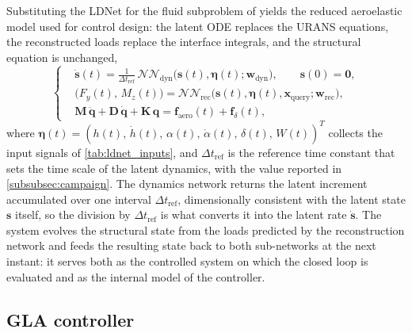 Substituting the LDNet for the fluid subproblem of  yields the reduced aeroelastic model used for control design: the latent ODE replaces the URANS equations, the reconstructed loads replace the interface integrals, and the structural equation is unchanged,
\begin{equation}
\left\{
\begin{aligned}
&\dot{\mathbf{s}}(t) = \frac{1}{\Delta t_{\mathrm{ref}}}\,
    \mathcal{NN}_{\mathrm{dyn}}\big(\mathbf{s}(t), \boldsymbol{\eta}(t);
    \mathbf{w}_{\mathrm{dyn}}\big), \qquad \mathbf{s}(0) = \mathbf{0},\\
&\bigl(F_y(t),\,M_z(t)\bigr) = \mathcal{NN}_{\mathrm{rec}}\big(\mathbf{s}(t), \boldsymbol{\eta}(t),
    \mathbf{x}_{\mathrm{query}}; \mathbf{w}_{\mathrm{rec}}\big),\\
&\mathbf{M}\,\ddot{\mathbf{q}} + \mathbf{D}\,\dot{\mathbf{q}} + \mathbf{K}\,\mathbf{q}
    = \mathbf{f}_{\text{aero}}(t) + \mathbf{f}_{\delta}(t),
\end{aligned}
\right.
\label{eq:reduced_system}
\end{equation}
where $\boldsymbol{\eta}(t) = (h(t),\,\dot h(t),\,\alpha(t),\,\dot\alpha(t),\,\delta(t),\,W(t))^{T}$ collects the input signals of \cref{tab:ldnet_inputs}, and $\Delta t_{\mathrm{ref}}$ is the reference time constant that sets the time scale of the latent dynamics, with the value reported in \cref{subsubsec:campaign}. The dynamics network returns the latent increment accumulated over one interval $\Delta t_{\mathrm{ref}}$, dimensionally consistent with the latent state $\mathbf{s}$ itself, so the division by $\Delta t_{\mathrm{ref}}$ is what converts it into the latent rate $\dot{\mathbf{s}}$. The system  evolves the structural state from the loads predicted by the reconstruction network and feeds the resulting state back to both sub-networks at the next instant: it serves both as the controlled system on which the closed loop is evaluated and as the internal model of the controller.

\subsection{GLA controller}
\label{subsec:controller}
\label{sec:controller}
\label{subsec:mpc_arch}


